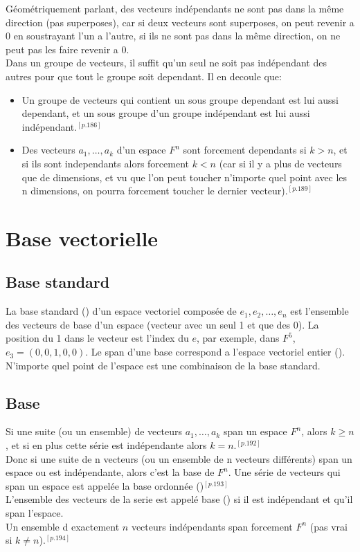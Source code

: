 \documentclass[12pt]{article}
\begin{document}
Géométriquement parlant, des vecteurs indépendants ne sont pas dans la même direction (pas superposes), car si deux vecteurs sont superposes, on peut revenir a 0 en soustrayant l'un a l'autre, si ils ne sont pas dans la même direction, on ne peut pas les faire revenir a 0. \\

Dans un groupe de vecteurs, il suffit qu'un seul ne soit pas indépendant des autres pour que tout le groupe soit dependant. Il en decoule que:
\begin{itemize}
  \item Un groupe de vecteurs qui contient un sous groupe dependant est lui aussi dependant, et un sous groupe d'un groupe indépendant est lui aussi indépendant.$^{[p.186]}$ 
  \item Des vecteurs $ a_1, \ldots, a_k$ d'un espace $F^{n}$ sont forcement dependants si $k > n$, et si ils sont independants alors forcement  $k < n$ (car si il y a plus de vecteurs que de dimensions, et vu que l'on peut toucher n'importe quel point avec les n dimensions, on pourra forcement toucher le dernier vecteur).$^{[p.189]}$ 

\end{itemize}

\section{Base vectorielle}
\subsection{Base standard}
La base standard () d'un espace vectoriel composée de $ e_1, e_2, \ldots, e_n$ est l'ensemble des vecteurs de base d'un espace (vecteur avec un seul 1 et que des 0). La position du 1 dans le vecteur est l'index du $e$, par exemple, dans  $F^{5}$, $ e_3 = (0,0,1,0,0)$. Le span d'une base correspond a l'espace vectoriel entier ().\\
N'importe quel point de l'espace est une combinaison de la base standard. \\

\subsection{Base}
Si une suite (ou un ensemble) de vecteurs $ a_1, \ldots, a_k$ span un espace $F^{n}$, alors $k \ge n$, et si en plus cette série est indépendante alors $k = n$.$^{[p.192]}$\\
Donc si une suite de n vecteurs (ou un ensemble de n vecteurs différents) span un espace ou est indépendante, alors c'est la base de $F^{n}$.
Une série de vecteurs qui span un espace est appelée la base ordonnée ()$^{[p.193]}$\\
L'ensemble des vecteurs de la serie est appelé  base () si il est indépendant et qu'il span l'espace.\\
Un ensemble d exactement $n$ vecteurs indépendants span forcement $F^{n}$ (pas vrai si $k \neq n$).$^{[p.194]}$ 
\end{document}
